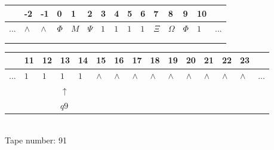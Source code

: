 \documentclass[11pt]{article}
\begin{document}
\begin{table}[H]
\centering
\begin{tabular}{lllllllllllllll}
 & -2 & -1 & 0 & 1 & 2 & 3 & 4 & 5 & 6 & 7 & 8 & 9 & 10 & \\
\hline
$...$ & \multicolumn{1}{|l|}{$\wedge$} & \multicolumn{1}{|l|}{$\wedge$} & \multicolumn{1}{|l|}{$\Phi$} & \multicolumn{1}{|l|}{$M$} & \multicolumn{1}{|l|}{$\Psi$} & \multicolumn{1}{|l|}{$1$} & \multicolumn{1}{|l|}{$1$} & \multicolumn{1}{|l|}{$1$} & \multicolumn{1}{|l|}{$1$} & \multicolumn{1}{|l|}{$\Xi$} & \multicolumn{1}{|l|}{$\Omega$} & \multicolumn{1}{|l|}{$\Phi$} & \multicolumn{1}{|l|}{$1$} & $...$\\
\hline
&  &  &  &  &  &  &  &  &  &  &  &  &  &  \\
&  &  &  &  &  &  &  &  &  &  &  &  &  &  \\
\end{tabular}
\begin{tabular}{lllllllllllllll}
 & 11 & 12 & 13 & 14 & 15 & 16 & 17 & 18 & 19 & 20 & 21 & 22 & 23 & \\
\hline
$...$ & \multicolumn{1}{|l|}{$1$} & \multicolumn{1}{|l|}{$1$} & \multicolumn{1}{|l|}{$1$} & \multicolumn{1}{|l|}{$1$} & \multicolumn{1}{|l|}{$\wedge$} & \multicolumn{1}{|l|}{$\wedge$} & \multicolumn{1}{|l|}{$\wedge$} & \multicolumn{1}{|l|}{$\wedge$} & \multicolumn{1}{|l|}{$\wedge$} & \multicolumn{1}{|l|}{$\wedge$} & \multicolumn{1}{|l|}{$\wedge$} & \multicolumn{1}{|l|}{$\wedge$} & \multicolumn{1}{|l|}{$\wedge$} & $...$\\
\hline
&  &  & $\uparrow$ &  &  &  &  &  &  &  &  &  &  &  \\
&  &  & $ q9 $ &  &  &  &  &  &  &  &  &  &  &  \\
\end{tabular}
\\
Tape number: 91
\noindent\makebox[\linewidth]{\hdashrule{\textwidth}{1pt}{1pt}}\end{table}
\clearpage
\end{document}
